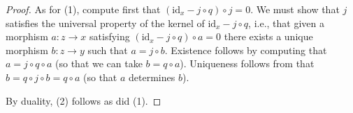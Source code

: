 \documentclass[10pt,a4paper]{amsart}
\theoremstyle{plain}
\theoremstyle{definition}
\theoremstyle{remark}
\numberwithin{equation}{subsection}
\begin{document}
\begin{proof}
As for (1), compute first that $(\text{id} _ x - j \circ q) \circ j = 0$.
We must show that $j$ satisfies the universal property
of the kernel of $\text{id} _ {x} - j \circ q$,
i.e., that given a morphism $a : z \to x$
satisfying $(\text{id} _ x - j \circ q) \circ a = 0$
there exists a unique morphism $b : z \to y$
such that $a = j \circ b$.
Existence follows by computing that $a = j \circ q \circ a$
(so that we can take $b = q \circ a$).
Uniqueness follows from that $b = q \circ j \circ b = q \circ a$
(so that $a$ determines $b$).

\medskip\noindent
By duality, (2) follows as did (1).
\end{proof}
\end{document}
